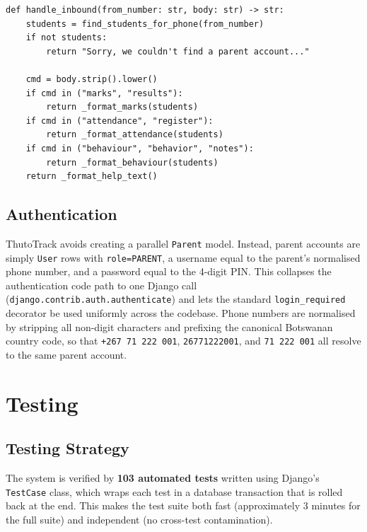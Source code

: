 \documentclass[11pt,a4paper]{article}
\begin{document}
\begin{lstlisting}[style=python, caption={WhatsApp command dispatch in \texttt{core/whatsapp.py}.}, label={lst:whatsapp}]
def handle_inbound(from_number: str, body: str) -> str:
    students = find_students_for_phone(from_number)
    if not students:
        return "Sorry, we couldn't find a parent account..."

    cmd = body.strip().lower()
    if cmd in ("marks", "results"):
        return _format_marks(students)
    if cmd in ("attendance", "register"):
        return _format_attendance(students)
    if cmd in ("behaviour", "behavior", "notes"):
        return _format_behaviour(students)
    return _format_help_text()
\end{lstlisting}

\subsection{Authentication}

ThutoTrack avoids creating a parallel \texttt{Parent} model. Instead, parent
accounts are simply \texttt{User} rows with \texttt{role=PARENT}, a username
equal to the parent's normalised phone number, and a password equal to the
4-digit PIN. This collapses the authentication code path to one Django call
(\texttt{django.contrib.auth.authenticate}) and lets the standard
\texttt{login\_required} decorator be used uniformly across the codebase.
Phone numbers are normalised by stripping all non-digit characters and
prefixing the canonical Botswanan country code, so that
\texttt{+267~71~222~001}, \texttt{26771222001}, and \texttt{71~222~001} all
resolve to the same parent account.

\section{Testing}

\subsection{Testing Strategy}

The system is verified by \textbf{103 automated tests} written using Django's
\texttt{TestCase} class, which wraps each test in a database transaction
that is rolled back at the end. This makes the test suite both fast
(approximately 3 minutes for the full suite) and independent (no
cross-test contamination).
\end{document}
